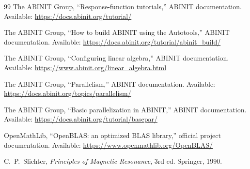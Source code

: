 \documentclass[11pt]{article}
\begin{document}
\begin{thebibliography}{99}
The ABINIT Group, ``Response-function tutorials,'' ABINIT documentation. Available: \url{https://docs.abinit.org/tutorial/}

The ABINIT Group, ``How to build ABINIT using the Autotools,'' ABINIT documentation. Available: \url{https://docs.abinit.org/tutorial/abinit_build/}

The ABINIT Group, ``Configuring linear algebra,'' ABINIT documentation. Available: \url{https://www.abinit.org/linear_algebra.html}

The ABINIT Group, ``Parallelism,'' ABINIT documentation. Available: \url{https://docs.abinit.org/topics/parallelism/}

The ABINIT Group, ``Basic parallelization in ABINIT,'' ABINIT documentation. Available: \url{https://docs.abinit.org/tutorial/basepar/}

OpenMathLib, ``OpenBLAS: an optimized BLAS library,'' official project documentation. Available: \url{https://www.openmathlib.org/OpenBLAS/}

C.~P.~Slichter, \emph{Principles of Magnetic Resonance}, 3rd ed.  Springer, 1990.

\end{thebibliography}
\end{document}

